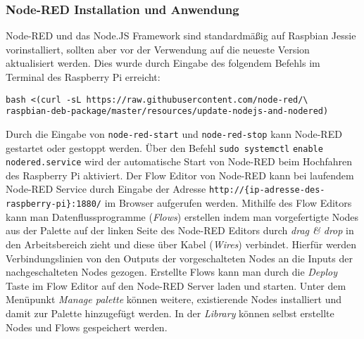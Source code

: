 \documentclass[BMR,Bachelor,ngerman]{twbook}%
\begin{document}
\subsubsection{Node-RED Installation und Anwendung}
Node-RED und das Node.JS Framework sind standardmäßig auf Raspbian Jessie vorinstalliert, sollten aber vor der Verwendung auf die neueste Version aktualisiert werden. Dies wurde durch Eingabe des folgendem Befehls im Terminal des Raspberry Pi erreicht: \begin{verbatim}bash <(curl -sL https://raw.githubusercontent.com/node-red/\ 
raspbian-deb-package/master/resources/update-nodejs-and-nodered)\end{verbatim}
Durch die Eingabe von \verb+node-red-start+ und \verb+node-red-stop+ kann Node-RED gestartet oder gestoppt werden. Über den Befehl \verb+sudo systemctl+ \verb+enable nodered.service+ wird der automatische Start von Node-RED beim Hochfahren des Raspberry Pi aktiviert. Der Flow Editor von Node-RED kann bei laufendem Node-RED Service durch Eingabe der Adresse \verb+http://{ip-adresse-des-raspberry-pi}:1880/+ im Browser aufgerufen werden. Mithilfe des Flow Editors kann man Datenflussprogramme (\emph{Flows}) erstellen indem man vorgefertigte Nodes aus der Palette auf der linken Seite des Node-RED Editors durch \emph{drag \& drop} in den Arbeitsbereich zieht und diese über Kabel (\emph{Wires}) verbindet. Hierfür werden Verbindungslinien von den Outputs der vorgeschalteten Nodes an die Inputs der nachgeschalteten Nodes gezogen. Erstellte Flows kann man durch die \emph{Deploy} Taste im Flow Editor auf den Node-RED Server laden und starten. Unter dem Menüpunkt \emph{Manage palette} können weitere, existierende Nodes installiert und damit zur Palette hinzugefügt werden. In der \emph{Library} können selbst erstellte Nodes und Flows gespeichert werden.
%
\end{document}
